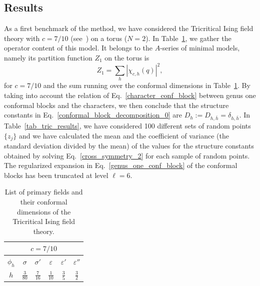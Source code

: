 \documentclass[a4paper,11pt]{article}
\begin{document}
\subsection{Results}

As a first benchmark of the method, we have considered the Tricritical 
Ising field theory with $c=7/10$ (see~\cite{Mussardo}) on a torus ($N=2$). 
In Table~\ref{tab_tric}, we gather the operator content
of this model. It belongs to the $A$-series of minimal models, namely  its partition function $Z_1$ on the torus is 
\begin{equation}
Z_1=\sum_{h}|\chi_{c,h}(q)|^2,
\end{equation}
for $c=7/10$ and the sum running over the conformal dimensions in Table~\ref{tab_tric}.
By taking into account the relation of Eq.~\eqref{character_conf_block} 
between genus one conformal blocks and the characters, we then  conclude that 
the structure constants in Eq.~\eqref{conformal_block_decomposition_0} are $D_h:= D_{h, \bar{h}}=\delta_{h, \bar{h}}$.  In Table~\ref{tab_tric_results}, we have considered 100 different sets of
random points $\{z_j\}$ and we have calculated the mean and 
the coefficient of  variance (the standard deviation divided by the mean) 
of the values for the structure constants obtained by solving Eq.~\eqref{cross_symmetry_2} 
for each sample of random points. The regularized expansion 
in Eq.~\eqref{genus_one_conf_block} of the conformal blocks has been truncated at level $\ell=6$.

\begin{table}[tbp]
\centering
\begin{tabular}{|c|c c c c c|}
\multicolumn{6}{c}{$c=7/10$}\\
\hline 
$\phi_h$ & $\sigma$ & $\sigma'$ & $\varepsilon$ & $\varepsilon'$ & $\varepsilon''$\\
\hline 
$h$ & $\frac{3}{80}$ & $\frac{7}{16}$ & $\frac{1}{10}$ & $\frac{3}{5}$ & $\frac{3}{2}$\\
\hline
\end{tabular}
\caption{\label{tab_tric} List of primary fields and their conformal dimensions of the 
Tricritical Ising field theory.}
\end{table}
\end{document}
